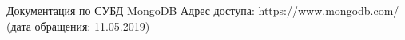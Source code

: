 \begin{thebibliography}{00}
Документация по СУБД MongoDB
Адрес доступа: https://www.mongodb.com/ (дата обращения: 11.05.2019)













\end{thebibliography}
